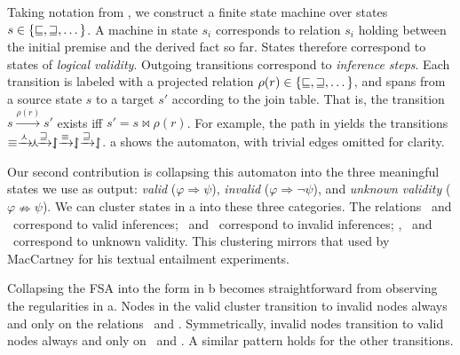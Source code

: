Taking notation from , we construct a
  finite state machine over states
  $s \in \{\textrm{\small{\forward}}, \textrm{\small{\reverse}}, \dots \}$.
A machine in state $s_i$ corresponds to relation $s_i$
  holding between the initial premise and the derived fact so far.
States therefore correspond to states of \textit{logical validity}.
Outgoing transitions correspond to \textit{inference steps}.
Each transition is labeled with a projected relation
  $\rho(r) \in \{\textrm{\small{\forward}}, \textrm{\small{\reverse}}, \dots\}$,
  and spans from a source
  state $s$ to a target $s'$ according to the join table.
That is, the transition $s \xrightarrow{\rho(r)} s'$ exists iff
  $s' = s \bowtie \rho(r)$.
For example, the path in  yields the
  transitions 
  $\equivalent \xrightarrow{\negate} \hspace{-0.5em} \negate \hspace{-0.5em}
               \xrightarrow{\reverse} \alternate
               \xrightarrow{\equivalent} \alternate
               \xrightarrow{\reverse} \alternate$.
a shows the automaton, with trivial edges
  omitted for clarity.

Our second contribution is collapsing this automaton into the three
  meaningful states we use as output: 
    \textit{valid} ($\varphi \Rightarrow \psi$),
    \textit{invalid} ($\varphi \Rightarrow \lnot \psi$),
  and \textit{unknown validity} ($\varphi \nRightarrow \psi$).
We can cluster states in a into these three categories.
The relations \equivalent\ and \forward\ correspond to valid inferences;
  \negate\ and \alternate\ correspond to invalid inferences;
  \reverse, \cover\ and \independent\ correspond to unknown validity.
This clustering mirrors that used by MacCartney for his textual
  entailment experiments.

Collapsing the FSA into the form in b becomes straightforward
  from observing the regularities in a.
Nodes in the valid cluster transition to invalid nodes
  always and only on the relations \negate\ and \alternate.
Symmetrically, invalid nodes transition to valid nodes always and only
  on \negate\ and \cover.
A similar pattern holds for the other transitions.

